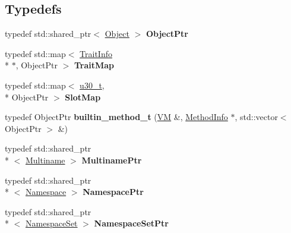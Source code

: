\subsection*{Typedefs}
\begin{DoxyCompactItemize}
\item 
\hypertarget{namespacejswf_1_1avm2_a492fde8193c7feab5aa20e1eb56f0aaa}{typedef std\+::shared\+\_\+ptr$<$ \hyperlink{classjswf_1_1avm2_1_1_object}{Object} $>$ {\bfseries Object\+Ptr}}\label{namespacejswf_1_1avm2_a492fde8193c7feab5aa20e1eb56f0aaa}

\item 
\hypertarget{namespacejswf_1_1avm2_a82f00917561ce4a5b09d62e7cfc01808}{typedef std\+::map$<$ \hyperlink{structjswf_1_1avm2_1_1_trait_info}{Trait\+Info} \\*
$\ast$, Object\+Ptr $>$ {\bfseries Trait\+Map}}\label{namespacejswf_1_1avm2_a82f00917561ce4a5b09d62e7cfc01808}

\item 
\hypertarget{namespacejswf_1_1avm2_afb439bad75a18054fae8823bed5d96ed}{typedef std\+::map$<$ \hyperlink{namespacejswf_aa10d9ddca2a6a5debdc261dfae3d1117}{u30\+\_\+t}, \\*
Object\+Ptr $>$ {\bfseries Slot\+Map}}\label{namespacejswf_1_1avm2_afb439bad75a18054fae8823bed5d96ed}

\item 
\hypertarget{namespacejswf_1_1avm2_ac9052c4272bab18ea583156c0beb4e45}{typedef Object\+Ptr {\bfseries builtin\+\_\+method\+\_\+t} (\hyperlink{classjswf_1_1avm2_1_1_v_m}{V\+M} \&, \hyperlink{structjswf_1_1avm2_1_1_method_info}{Method\+Info} $\ast$, std\+::vector$<$ Object\+Ptr $>$ \&)}\label{namespacejswf_1_1avm2_ac9052c4272bab18ea583156c0beb4e45}

\item 
\hypertarget{namespacejswf_1_1avm2_a97947edf8683676aec54ac5cad72911d}{typedef std\+::shared\+\_\+ptr\\*
$<$ \hyperlink{structjswf_1_1avm2_1_1_multiname}{Multiname} $>$ {\bfseries Multiname\+Ptr}}\label{namespacejswf_1_1avm2_a97947edf8683676aec54ac5cad72911d}

\item 
\hypertarget{namespacejswf_1_1avm2_a7355012fd048cbc222a90ba7ddb453c5}{typedef std\+::shared\+\_\+ptr\\*
$<$ \hyperlink{structjswf_1_1avm2_1_1_namespace}{Namespace} $>$ {\bfseries Namespace\+Ptr}}\label{namespacejswf_1_1avm2_a7355012fd048cbc222a90ba7ddb453c5}

\item 
\hypertarget{namespacejswf_1_1avm2_acd0090c534a50cf627b2ba5fcee20cd1}{typedef std\+::shared\+\_\+ptr\\*
$<$ \hyperlink{structjswf_1_1avm2_1_1_namespace_set}{Namespace\+Set} $>$ {\bfseries Namespace\+Set\+Ptr}}\label{namespacejswf_1_1avm2_acd0090c534a50cf627b2ba5fcee20cd1}


\end{DoxyCompactItemize}
